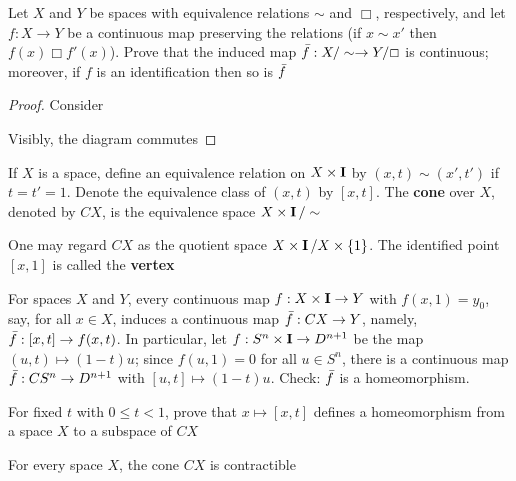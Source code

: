 \documentclass[11pt]{article}
\begin{document}
\begin{exercise}
\label{ex1.11}
Let \(X\) and \(Y\) be spaces with equivalence relations \(\sim\) and \(\Box\), respectively, and
let \(f:X\to Y\) be a continuous map preserving the relations (if \(x\sim x'\) then \(f(x)\Box f'(x)\)).
Prove that the induced map \(\bar{f}:X/\sim\to Y/\Box\) is continuous; moreover, if \(f\) is an
identification then so is \(\bar{f}\)
\end{exercise}

\begin{proof}
Consider
\begin{center}\end{center}
Visibly, the diagram commutes
\end{proof}

\begin{definition}[]
If \(X\) is a space, define an equivalence relation on \(X\times\operatorname{\textbf{I}}\) by \((x,t)\sim(x',t')\)
if \(t=t'=1\). Denote the equivalence class of \((x,t)\) by \([x,t]\). The \textbf{cone} over \(X\),
denoted by \(CX\), is the equivalence space \(X\times\operatorname{\textbf{I}}/\sim\)
\end{definition}

One may regard \(CX\) as the quotient space \(X\times\operatorname{\textbf{I}}/X\times\{1\}\). The identified point \([x,1]\) is
called the \textbf{vertex}

\begin{examplle}[]
For spaces \(X\) and \(Y\), every continuous map \(f:X\times\operatorname{\textbf{I}}\to Y\) with \(f(x,1)=y_0\), say, for
all \(x\in X\), induces a continuous map \(\bar{f}:CX\to Y\), namely, \(\bar{f}:[x,t]\to f(x,t)\). In
particular, let \(f:S^n\times\operatorname{\textbf{I}}\to D^{n+1}\) be the map \((u,t)\mapsto(1-t)u\); since \(f(u,1)=0\) for
all \(u\in S^n\), there is a continuous map \(\bar{f}:CS^n\to D^{n+1}\) with \([u,t]\mapsto(1-t)u\).
Check: \(\bar{f}\) is a homeomorphism.
\end{examplle}

\begin{exercise}
\label{ex1.13}
For fixed \(t\) with \(0\le t<1\), prove that \(x\mapsto[x,t]\) defines a homeomorphism from a
space \(X\) to a subspace of \(CX\)
\end{exercise}

\begin{theorem}[]
For every space \(X\), the cone \(CX\) is contractible
\end{theorem}
\end{document}
